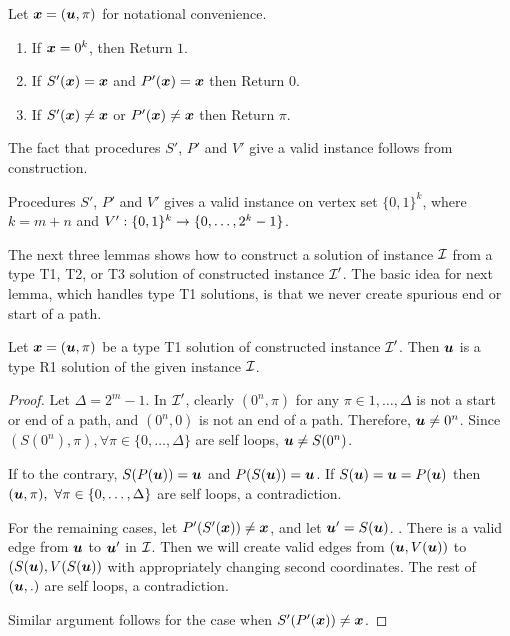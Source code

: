  Let $\mbox{\boldmath $x$}=(\mbox{\boldmath $u$},\pi)$ for notational convenience.
\vspace{-0.2cm}

\begin{enumerate}
\item If $\mbox{\boldmath $x$}=0^k$, then Return $1$. 
\item If $S'(\mbox{\boldmath $x$}) = \mbox{\boldmath $x$}$ and $P'(\mbox{\boldmath $x$})=\mbox{\boldmath $x$}$ then Return $0$.
\item If $S'(\mbox{\boldmath $x$}) \neq \mbox{\boldmath $x$}$ or $P'(\mbox{\boldmath $x$})\neq \mbox{\boldmath $x$}$ then Return $\pi$.
\end{enumerate}

The fact that procedures $S'$, $P'$ and $V'$ give a valid \EOML instance follows from construction.
\begin{lemma}\label{lem:p2m-valid}
Procedures $S'$, $P'$ and $V'$ gives a valid \EOML instance on vertex set $\{0,1\}^k$, where $k=m+n$ and $V':\{0,1\}^k\rightarrow \{0,\dots, 2^k-1\}$.
\end{lemma}

The next three lemmas shows how to construct a solution of \EOPL instance $\mbox{${\mathcal I}$}$ from a type T1, T2, or T3 solution of constructed \EOML instance $\mbox{${\mathcal I}$}'$.
The basic idea for next lemma, which handles type T1 solutions, is that we never create spurious end or start of a path. 
\begin{lemma}\label{lem:p2m-t1}
Let $\mbox{\boldmath $x$}=(\mbox{\boldmath $u$},\pi)$ be a type T1 solution of constructed \EOML instance $\mbox{${\mathcal I}$}'$. Then $\mbox{\boldmath $u$}$ is a type R1 solution of the given \EOPL instance $\mbox{${\mathcal I}$}$.
\end{lemma}

\begin{proof}
Let $\Delta=2^m-1$.
In $\mbox{${\mathcal I}$}'$, clearly $(0^n,\pi)$ for any $\pi \in {1,\dots, \Delta}$ is not a start or end of a path, and $(0^n,0)$ is not an end of a path. Therefore, $\mbox{\boldmath $u$}\neq 0^n$. Since $(S(0^n),\pi), \forall \pi\in \{0,\dots,\Delta\}$ are self loops, $\mbox{\boldmath $u$} \neq S(0^n)$.

If to the contrary, $S(P(\mbox{\boldmath $u$}))=\mbox{\boldmath $u$}$ and $P(S(\mbox{\boldmath $u$}))=\mbox{\boldmath $u$}$. If $S(\mbox{\boldmath $u$})=\mbox{\boldmath $u$}=P(\mbox{\boldmath $u$})$ then $(\mbox{\boldmath $u$},\pi),\ \forall \pi\in\{0,\dots,\Delta\}$ are self loops, a contradiction. 

For the remaining cases, let $P'(S'(\mbox{\boldmath $x$}))\neq \mbox{\boldmath $x$}$, and let $\mbox{\boldmath $u$}'=S(\mbox{\boldmath $u$})$. . There is a valid edge from $\mbox{\boldmath $u$}$ to $\mbox{\boldmath $u$}'$ in $\mbox{${\mathcal I}$}$. Then we will create valid edges from $(\mbox{\boldmath $u$},V(\mbox{\boldmath $u$}))$ to $(S(\mbox{\boldmath $u$}),V(S(\mbox{\boldmath $u$}))$ with appropriately changing second coordinates. The rest of $(\mbox{\boldmath $u$},.)$ are self loops, a contradiction. 

Similar argument follows for the case when $S'(P'(\mbox{\boldmath $x$}))\neq \mbox{\boldmath $x$}$. 
\end{proof}

